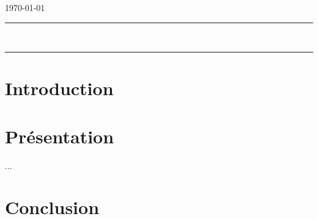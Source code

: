 \documentclass[a4paper,11pt]{article}
\author{\auteur}
\title{\titre}
\date{\today}
\begin{document}
	
	\thispagestyle{empty}
	\noindent \cours \hfill \ecole{} \newline
	\noindent \auteur \hfill \today \newline
	\hrule
	\vspace{7mm}
	\noindent {\large \bf \domaine } \hfill \titre {\large \bf }\\[3mm]
	\hrule
	
	\tableofcontents
	\newpage
	
	\section{Introduction}
	
	\section{Présentation}
	
	... 
		
	\section{Conclusion}
	
	
\end{document}
